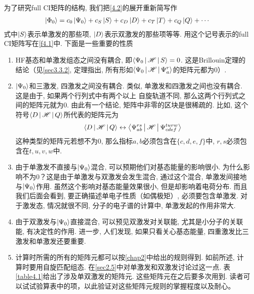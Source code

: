 为了研究full CI矩阵的结构, 
我们把\eqref{4.2}的展开重新简写作
\begin{align}
\Ket{\Phi_0} = c_0\Ket{\Psi_0} + c_S\Ket{S}+c_D\Ket{D} + c_T\Ket{T} + c_Q\Ket{Q} + \cdots
\end{align}
式中$\Ket{S}$表示单激发的那些项, 
$\Ket{D}$表示双激发的那些项等等. 
用这个记号表示的full CI矩阵写在\ref{f4.1}中. 
下面是一些重要的性质
\begin{enumerate}[1.]
	\item HF基态和单激发组态之间没有耦合, 即$\Braket{\Psi_0|\mathscr{H}|S}=0$. 这是Brillouin定理的结论（见\ref{sec3.3.2}, 定理指出, 所有形如$\Braket{\Psi_0|\mathscr{H}|\Psi_a^r}$的矩阵元都为0）.
	\item
	$\Ket{\Psi_0}$和三激发, 四激发之间没有耦合. 类似, 单激发和四激发之间也没有耦合. 这是由于, 如果两个行列式中有两个以上 自旋轨道不同, 那么这两个行列式之间的\ha 矩阵元就为0. 由此有一个结论, 矩阵中非零的区块是很稀疏的. 比如, 这个符号$\Braket{D|\mathscr{H}|Q}$所代表的矩阵元为
	\begin{align*}
	\Braket{D|\mathscr{H}|Q} \leftrightarrow \Braket{\Psi_{ab}^{rs}|\mathscr{H}|\Psi_{cdef}^{tuvw}}
	\end{align*}
	这种类型的矩阵元若想不为0, 那么指标$a,b$必须包含在$\{c,d,e,f\}$中, $r,s$必须包含在$t,u,v,w$中.
	
	\item
	由于单激发不直接与$\Ket{\Psi_0}$混合, 可以预期他们对基态能量的影响很小. 为什么影响不为0？这是由于单激发与双激发会发生混合, 通过这个混合, 单激发间接地与$\Ket{\Psi_0}$作用. 虽然这个影响对基态能量效果很小, 但是却影响着电荷分布. 而且我们后面会看到, 要正确描述单电子性质（如偶极矩）, 必须要包含单激发. 对于激发态, 情况就很不同, 分子的电子谱的计算中, 单激发起的作用非常大.
	\item 
	由于双激发与$\Ket{\Psi_0}$直接混合, 可以预见双激发对关联能, 尤其是小分子的关联能, 有决定性的作用. 进一步, 人们发现, 如果只看关心基态能量, 四重激发比三激发和单激发还要重要.
	\item
	计算时所需的所有的矩阵元都可以按\ref{chap2}中给出的规则得到. 
如前所述, 计算时要用自旋匹配组态. 
在\ref{sec2.5}中对单激发和双激发讨论过这一点. 
表\ref{table4.1}给出了涉及单双激发的矩阵元. 这些矩阵元在之后要多次用到. 读者可以试试验算表中的项，以此验证对这些矩阵元规则的掌握程度以及耐心。
\end{enumerate}

